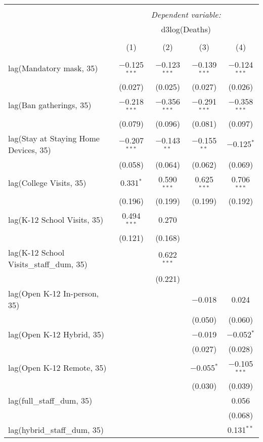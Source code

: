 \begin{tabular}{@{\extracolsep{1pt}}lcccc} 
\\[-1.8ex]\hline 
\hline \\[-1.8ex] 
 & \multicolumn{4}{c}{\textit{Dependent variable:}} \\ 
\cline{2-5} 
 & \multicolumn{4}{c}{d3log(Deaths)} \\ 
\\[-1.8ex] & (1) & (2) & (3) & (4)\\ 
\hline \\[-1.8ex] 
 lag(Mandatory mask, 35) & $-$0.125$^{***}$ & $-$0.123$^{***}$ & $-$0.139$^{***}$ & $-$0.124$^{***}$ \\ 
  & (0.027) & (0.025) & (0.027) & (0.026) \\ 
  lag(Ban gatherings, 35) & $-$0.218$^{***}$ & $-$0.356$^{***}$ & $-$0.291$^{***}$ & $-$0.358$^{***}$ \\ 
  & (0.079) & (0.096) & (0.081) & (0.097) \\ 
  lag(Stay at Staying Home Devices, 35) & $-$0.207$^{***}$ & $-$0.143$^{**}$ & $-$0.155$^{**}$ & $-$0.125$^{*}$ \\ 
  & (0.058) & (0.064) & (0.062) & (0.069) \\ 
  lag(College Visits, 35) & 0.331$^{*}$ & 0.590$^{***}$ & 0.625$^{***}$ & 0.706$^{***}$ \\ 
  & (0.196) & (0.199) & (0.199) & (0.192) \\ 
  lag(K-12 School Visits, 35) & 0.494$^{***}$ & 0.270 &  &  \\ 
  & (0.121) & (0.168) &  &  \\ 
  lag(K-12 School Visits\_staff\_dum, 35) &  & 0.622$^{***}$ &  &  \\ 
  &  & (0.221) &  &  \\ 
  lag(Open K-12 In-person, 35) &  &  & $-$0.018 & 0.024 \\ 
  &  &  & (0.050) & (0.060) \\ 
  lag(Open K-12 Hybrid, 35) &  &  & $-$0.019 & $-$0.052$^{*}$ \\ 
  &  &  & (0.027) & (0.028) \\ 
  lag(Open K-12 Remote, 35) &  &  & $-$0.055$^{*}$ & $-$0.105$^{***}$ \\ 
  &  &  & (0.030) & (0.039) \\ 
  lag(full\_staff\_dum, 35) &  &  &  & 0.056 \\ 
  &  &  &  & (0.068) \\ 
  lag(hybrid\_staff\_dum, 35) &  &  &  & 0.131$^{**}$ \\ 

\end{tabular}

